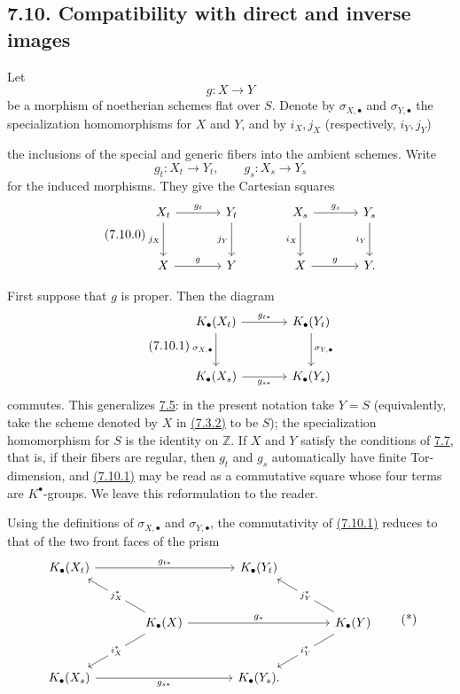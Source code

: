 \subsection*{7.10. Compatibility with direct and inverse images}
Let
\[
g:X\longrightarrow Y
\]
be a morphism of noetherian schemes flat over $S$. Denote by
$\sigma_{X,\bullet}$ and $\sigma_{Y,\bullet}$ the specialization
homomorphisms for $X$ and $Y$, and by
$i_X,j_X$ (respectively, $i_Y,j_Y$)

the inclusions of the special and generic fibers into the ambient schemes.
Write
\[
g_t:X_t\longrightarrow Y_t,
\qquad
g_s:X_s\longrightarrow Y_s
\]
for the induced morphisms. They give the Cartesian squares
\begin{equation}\tag{7.10.0}
\begin{tikzcd}[column sep=large,row sep=large]
X_t \arrow[r,"g_t"] \arrow[d,"j_X"'] & Y_t \arrow[d,"j_Y"'] &
X_s \arrow[r,"g_s"] \arrow[d,"i_X"'] & Y_s \arrow[d,"i_Y"']\\
X \arrow[r,"g"] & Y & X \arrow[r,"g"] & Y.
\end{tikzcd}
\end{equation}

First suppose that $g$ is proper. Then the diagram
\begin{equation}\tag{7.10.1}
\begin{tikzcd}[column sep=large,row sep=large]
K_\bullet(X_t) \arrow[r,"g_{t*}"] \arrow[d,"\sigma_{X,\bullet}"'] &
K_\bullet(Y_t) \arrow[d,"\sigma_{Y,\bullet}"]\\
K_\bullet(X_s) \arrow[r,"g_{s*}"'] & K_\bullet(Y_s)
\end{tikzcd}
\end{equation}
commutes. This generalizes \hyperlink{sga6.e10.sec.7.5}{7.5}: in the present notation take $Y=S$
(equivalently, take the scheme denoted by $X$ in \hyperlink{sga6.e10.eq.7-3-2}{(7.3.2)} to be $S$); the
specialization homomorphism for $S$ is the identity on $\mathbb Z$. If $X$
and $Y$ satisfy the conditions of \hyperlink{sga6.e10.sec.7.7}{7.7}, that is, if their fibers are
regular, then $g_t$ and $g_s$ automatically have finite Tor-dimension, and
\hyperlink{sga6.e10.eq.7-10-1}{(7.10.1)} may be read as a commutative square whose four terms are
$K^\bullet$-groups. We leave this reformulation to the reader.

Using the definitions of $\sigma_{X,\bullet}$ and $\sigma_{Y,\bullet}$,
the commutativity of \hyperlink{sga6.e10.eq.7-10-1}{(7.10.1)} reduces to that of the two front faces of the
prism
\[
\begin{tikzcd}[column sep=large,row sep=large]
K_\bullet(X_t) \arrow[rr,"g_{t*}"] && K_\bullet(Y_t)\\
& K_\bullet(X) \arrow[ul,"j_X^*" description]
  \arrow[dl,"i_X^*" description] \arrow[rr,"g_*"] &&
K_\bullet(Y) \arrow[ul,"j_Y^*" description]
  \arrow[dl,"i_Y^*" description]\\
K_\bullet(X_s) \arrow[rr,"g_{s*}"'] && K_\bullet(Y_s).
\end{tikzcd}
\tag{*}
\]

